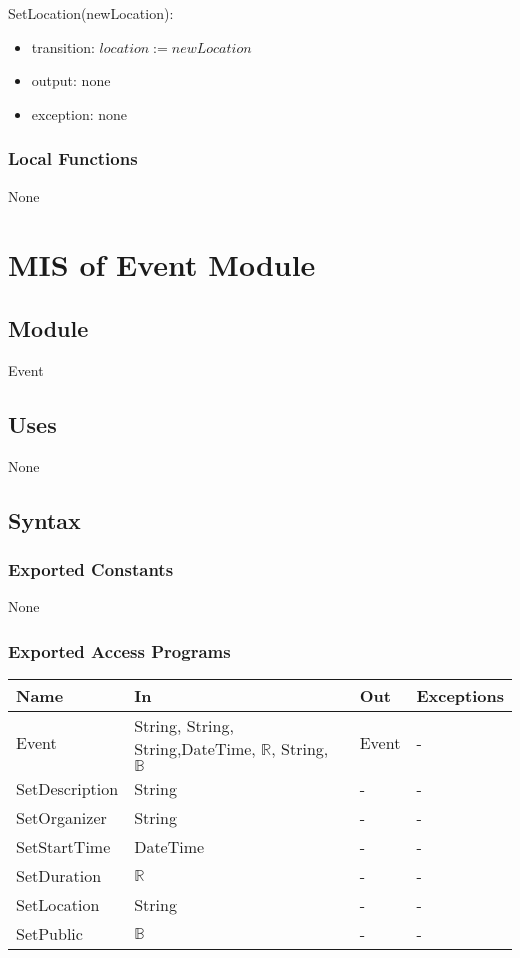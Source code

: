 \documentclass[12pt, titlepage]{article}
\begin{document}
\noindent SetLocation(newLocation):
\begin{itemize}
\item transition: $location := newLocation$
\item output: none
\item exception: none
\end{itemize}
\subsubsection{Local Functions}

None

\newpage

\section{MIS of Event Module} \label{mEvent}

\subsection{Module}

Event

\subsection{Uses}

None

\subsection{Syntax}

\subsubsection{Exported Constants}
None

\subsubsection{Exported Access Programs}
\begin{center}
\begin{tabular}{p{4cm} p{2cm} p{4cm} p{4cm}}
\hline
\textbf{Name} & \textbf{In} & \textbf{Out} & \textbf{Exceptions} \\
\hline
Event & String, String, String,DateTime, $\mathbb{R}$, String, $\mathbb{B}$ & Event & -\\
SetDescription & String & - & -\\
SetOrganizer & String & - & -\\
SetStartTime & DateTime & - & -\\
SetDuration & $\mathbb{R}$ & - & -\\
SetLocation & String & - & -\\
SetPublic & $\mathbb{B}$ & - & -\\
\hline
\end{tabular}
\end{center}
\end{document}
